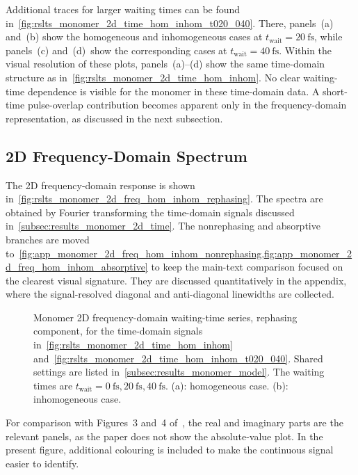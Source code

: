Additional traces for larger waiting times can be found in~\autoref{fig:rslts_monomer_2d_time_hom_inhom_t020_040}. There,
panels~(a) and~(b) show the homogeneous and inhomogeneous cases at
\(t_{\mathrm{wait}}=\SI{20}{\femto\second}\), while panels~(c) and~(d)\ show
the corresponding cases at \(t_{\mathrm{wait}}=\SI{40}{\femto\second}\).
Within the visual resolution of these plots, panels~(a)--(d) show the same
time-domain structure as in~\autoref{fig:rslts_monomer_2d_time_hom_inhom}. No
clear waiting-time dependence is visible for the monomer in these time-domain
data. A short-time pulse-overlap contribution becomes apparent only in the
frequency-domain representation, as discussed in the next subsection.

\subsection{2D Frequency-Domain Spectrum}
\label{subsec:results_monomer_2d_freq}

The 2D frequency-domain response is shown
in~\autoref{fig:rslts_monomer_2d_freq_hom_inhom_rephasing}. The spectra are
obtained by Fourier transforming the time-domain signals discussed
in~\autoref{subsec:results_monomer_2d_time}. The nonrephasing and absorptive branches are moved
to~\cref{fig:app_monomer_2d_freq_hom_inhom_nonrephasing,fig:app_monomer_2d_freq_hom_inhom_absorptive}
to keep the main-text comparison focused on the clearest visual signature. They are discussed quantitatively in the appendix, where the signal-resolved diagonal and anti-diagonal linewidths are collected.

\begin{figure}[htbp]
    \centering
\caption{Monomer 2D frequency-domain waiting-time series, rephasing
component, for the time-domain signals in~\autoref{fig:rslts_monomer_2d_time_hom_inhom}
and~\autoref{fig:rslts_monomer_2d_time_hom_inhom_t020_040}. Shared settings are listed
in~\autoref{subsec:results_monomer_model}. The waiting times are
\(t_{\mathrm{wait}}=\SI{0}{\femto\second},\SI{20}{\femto\second},\SI{40}{\femto\second}\). (a):
homogeneous case. (b): inhomogeneous case.}
    \label{fig:rslts_monomer_2d_freq_hom_inhom_rephasing}
\end{figure}

For comparison with Figures~3 and~4 of~\cite{mancaletal2006twodimensionalopticalthreepulse}, the real and imaginary parts
are the relevant panels, as the paper does not show the absolute-value plot. In the present figure, additional colouring is included
to make the continuous signal easier to identify.

